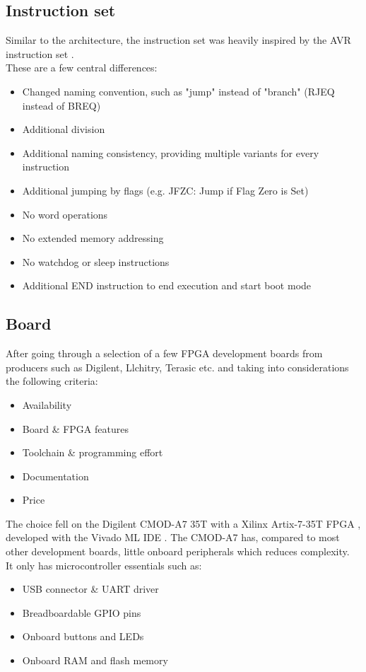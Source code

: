 \subsection{Instruction set}
Similar to the architecture, the instruction set was heavily inspired by the AVR instruction set \cite{avr-instruction-set}.\\
These are a few central differences:
\begin{itemize}
    \item Changed naming convention, such as "jump" instead of "branch" (RJEQ instead of BREQ)
    \item Additional division
    \item Additional naming consistency, providing multiple variants for every instruction
    \item Additional jumping by flags (e.g. JFZC: Jump if Flag Zero is Set)
    \item No word operations
    \item No extended memory addressing
    \item No watchdog or sleep instructions
    \item Additional END instruction to end execution and start boot mode
\end{itemize}

\subsection{Board}
After going through a selection of a few FPGA development boards from producers such as Digilent, Llchitry, Terasic etc.
and taking into considerations the following criteria:
\begin{itemize}
    \item Availability
    \item Board \& FPGA features
    \item Toolchain \& programming effort
    \item Documentation
    \item Price 
\end{itemize}
The choice fell on the Digilent CMOD-A7 35T \cite{cmod-a7-manual} with a Xilinx Artix-7-35T FPGA \cite{7series-overview}, developed with the Vivado ML IDE \cite{vivado}.
The CMOD-A7 has, compared to most other development boards, little onboard peripherals which reduces complexity.\\
It only has microcontroller essentials such as:
\begin{itemize}
    \item USB connector \& UART driver
    \item Breadboardable GPIO pins
    \item Onboard buttons and LEDs
    \item Onboard RAM and flash memory
\end{itemize}


